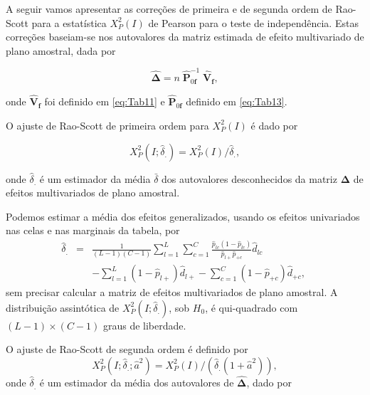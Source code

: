 \documentclass[]{book}
\numberwithin{example}{chapter}
\numberwithin{remark}{chapter}
\numberwithin{definition}{chapter}
\begin{document}
A seguir vamos apresentar as correções de primeira e de segunda ordem de
Rao-Scott para a estatística \(X_{P}^{2}\left( I\right)\) de Pearson
para o teste de independência. Estas correções baseiam-se nos
autovalores da matriz estimada de efeito multivariado de plano amostral,
dada por

\begin{equation}
\mathbf{\hat{\Delta}}=n\;\mathbf{\hat{P}}_{0\mathbf{f}}^{-1}\;\mathbf{\hat{V}
}_{\mathbf{f}},  \label{eq:Tab14}
\end{equation}

onde \(\mathbf{\hat{V}}_{\mathbf{f}}\) foi definido em \eqref{eq:Tab11} e
\(\mathbf{ \hat{P}}_{0\mathbf{f}}\) definido em \eqref{eq:Tab13}.

O ajuste de Rao-Scott de primeira ordem para
\(X_{P}^{2}\left( I\right)\) é dado por

\begin{equation}
X_{P}^{2}\left( I;\hat{\delta}_{.}\right) =X_{P}^{2}\left( I\right) /\hat{
\delta}_{.},  \label{eq:Tab15}
\end{equation}

onde \(\hat{\delta}_{.}\) é um estimador da média \(\bar{\delta}\) dos
autovalores desconhecidos da matriz \(\mathbf{\Delta }\) de efeitos
multivariados de plano amostral.

Podemos estimar a média dos efeitos generalizados, usando os efeitos
univariados nas celas e nas marginais da tabela, por \[
\begin{array}{lll}
\hat{\delta}_{.} & = & \frac{1}{\left( L-1\right) \left( C-1\right) }
\sum\limits_{l=1}^{L}\sum\limits_{c=1}^{C}\frac{\hat{p}_{lc}\left( 1-\hat{p}
_{lc}\right) }{\hat{p}_{l+}\hat{p}_{+c}}\hat{d}_{lc} \\ 
&  & -\sum\limits_{l=1}^{L}\left( 1-\hat{p}_{l+}\right) \hat{d}
_{l+}-\sum\limits_{c=1}^{C}\left( 1-\hat{p}_{+c}\right) \hat{d}_{+c},
\end{array}
\;
\] sem precisar calcular a matriz de efeitos multivariados de plano
amostral. A distribuição assintótica de
\(X_{P}^{2}\left( I;\hat{\delta} _{.}\right)\), sob \(H_{0}\), é
qui-quadrado com \(\left( L-1\right) \times \left( C-1\right)\) graus de
liberdade.

O ajuste de Rao-Scott de segunda ordem é definido por \[
X_{P}^{2}\left( I;\hat{\delta}_{.};\hat{a}^{2}\right) =X_{P}^{2}\left(
I\right) /\left( \hat{\delta}_{.}\left( 1+\hat{a}^{2}\right) \right), 
\] onde \(\hat{\delta}_{.}\) é um estimador da média dos autovalores de
\(\mathbf{\hat{\Delta}}\), dado por
\end{document}
